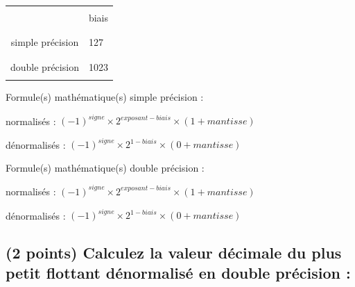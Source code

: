 \documentclass[11pt,a4paper]{article}
\begin{document}
\begin{table}[!ht]
  \centering
  \begin{minipage}{0.40\textwidth}
    \centering

\begin{tabular}{| c | C{1.5cm} |}
\hline
 & \\
 & biais \\
 & \\
\hline
 & \\
simple précision & 127 \\
 & \\
\hline
 & \\
double précision & 1023 \\
 & \\
\hline
\end{tabular}

  \end{minipage}
  \hfillx
  \begin{minipage}{0.60\textwidth}
    \centering

Formule(s) mathématique(s) simple précision :

\medskip

normalisés : $ (-1)^{signe} \times 2^{exposant - biais} \times (1 + mantisse) $

\smallskip

dénormalisés : $ (-1)^{signe} \times 2^{1 - biais} \times (0 + mantisse) $


\vspace*{0.75cm}


Formule(s) mathématique(s) double précision :

normalisés : $ (-1)^{signe} \times 2^{exposant - biais} \times (1 + mantisse) $

\smallskip

dénormalisés : $ (-1)^{signe} \times 2^{1 - biais} \times (0 + mantisse) $

\vspace*{1.75cm}

  \end{minipage}
\end{table}


\vspace*{-0.5cm}

\subsection{(2 points) Calculez la valeur décimale du plus petit flottant dénormalisé en double précision : }
\end{document}

